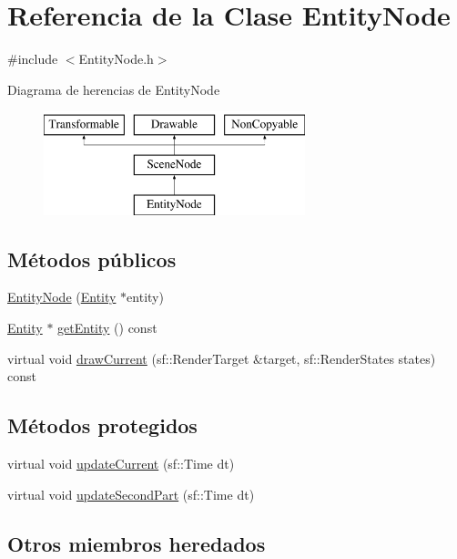 \hypertarget{classEntityNode}{}\section{Referencia de la Clase Entity\+Node}
\label{classEntityNode}


{\ttfamily \#include $<$Entity\+Node.\+h$>$}

Diagrama de herencias de Entity\+Node\begin{figure}[H]
\begin{center}
\leavevmode
\includegraphics[height=3.000000cm]{classEntityNode}
\end{center}
\end{figure}
\subsection*{Métodos públicos}
\begin{DoxyCompactItemize}
\item 
\hyperlink{classEntityNode_adffc23015f30c960d0e02b9f51ff3742}{Entity\+Node} (\hyperlink{classEntity}{Entity} $\ast$entity)
\item 
\hyperlink{classEntity}{Entity} $\ast$ \hyperlink{classEntityNode_a5eb78668e4ff76d50aed68a9b6b028e2}{get\+Entity} () const 
\item 
virtual void \hyperlink{classEntityNode_afcda1234f815222781206bce3e41e67b}{draw\+Current} (sf\+::\+Render\+Target \&target, sf\+::\+Render\+States states) const 
\end{DoxyCompactItemize}
\subsection*{Métodos protegidos}
\begin{DoxyCompactItemize}
\item 
virtual void \hyperlink{classEntityNode_a1fdda1735246e22462e63b7872ddb972}{update\+Current} (sf\+::\+Time dt)
\item 
virtual void \hyperlink{classEntityNode_a90f8743448c763b4cd302dbbd2491bb0}{update\+Second\+Part} (sf\+::\+Time dt)
\end{DoxyCompactItemize}
\subsection*{Otros miembros heredados}


